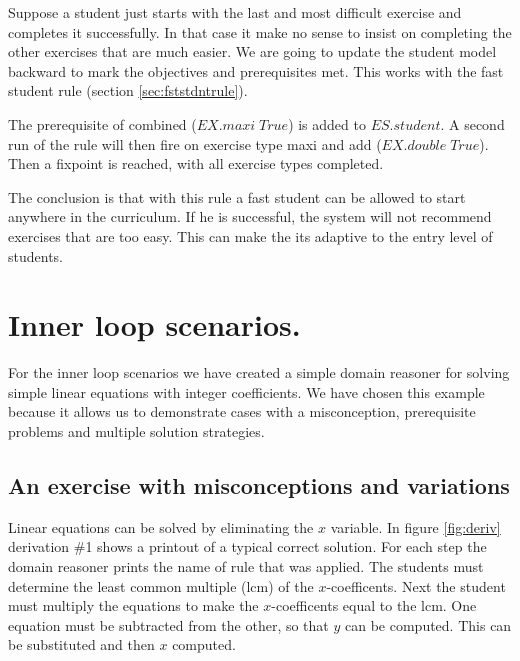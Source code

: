 Suppose a student just starts with the last and most difficult exercise and completes it successfully.
In that case it make no sense to insist on completing the other exercises that are much easier.
We are going to update the student model backward to mark the objectives and prerequisites met.
This works with the fast student rule (section \ref{sec:fststdntrule}).

The prerequisite of combined ($\mathit{EX.maxi \; True}$) is added to $\mathit{ES.student}$.
A second run of the rule will then fire on exercise type maxi and add ($\mathit{EX.double \; True}$).
Then a fixpoint is reached, with all exercise types completed.

The conclusion is that with this rule a fast student can be allowed to start anywhere in the curriculum.
If he is successful, the system will not recommend exercises that are too easy. 
This can make the \gls{its} adaptive to the entry level of students.

\section{Inner loop scenarios.}

For the inner loop scenarios we have created a simple domain reasoner for solving simple linear equations with integer coefficients.
We have chosen this example because it allows us to demonstrate cases with a misconception, prerequisite problems and multiple solution strategies.

\subsection{An exercise with misconceptions and variations}
Linear equations can be solved by eliminating the $x$ variable. 
In figure \ref{fig:deriv} derivation \#1 shows a printout of a typical correct solution.
For each step the domain reasoner prints the name of rule that was applied.
The students must determine the least common multiple (lcm) of the $x$-coefficents.
Next the student must multiply the equations to make the $x$-coefficents equal to the lcm.
One equation must be subtracted from the other, so that $y$ can be computed. 
This can be substituted and then $x$ computed.

